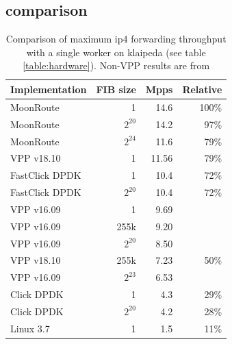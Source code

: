 \subsection{comparison}


\begin{table}[!ht]
	\vspace{5ex}
	\begin{tabular}[]{ l r r r }
		Implementation & FIB size & Mpps & Relative \\ 
		\midrule
		MoonRoute & 1 & 14.6 & 100\% \\
		MoonRoute & $2^{20}$ & 14.2 & 97\% \\
		MoonRoute & $2^{24}$ & 11.6 & 79\% \\
		VPP v18.10 & 1 & 11.56 & 79\% \\
		FastClick DPDK & 1 & 10.4 & 72\% \\
		FastClick DPDK & $2^{20}$ & 10.4 & 72\% \\
		VPP v16.09 & 1 & 9.69 & \\
		VPP v16.09 & 255k & 9.20 & \\
		VPP v16.09 & $2^{20}$ & 8.50 & \\
		VPP v18.10 & 255k & 7.23 & 50\% \\
		VPP v16.09 & $2^{23}$ & 6.53 & \\
		Click DPDK & 1 & 4.3 & 29\% \\
		Click DPDK & $2^{20}$ & 4.2 & 28\% \\
		Linux 3.7 & 1 & 1.5 & 11\% \\

		\midrule
	\end{tabular}
	\caption{Comparison of maximum \Ac{ip4} forwarding throughput with a single worker on klaipeda (see table \ref{table:hardware}). Non-VPP results are from \cite{chair:architecture}}
	\label{table:comparison}
\end{table}